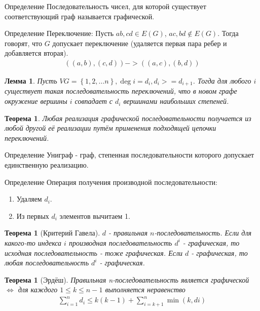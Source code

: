 \documentclass[a4paper,openany]{book}
\newcounter{TheoremCounter}
\newtheorem{theorem}[TheoremCounter]{Теорема}
\newtheorem*{lemma}{Лемма}
\newenvironment{definition}
{\begin{statement}{Определение}}
    {\end{statement}}
\newcommand{\set}[1]{
    \left\{ #1 \right\}
}
\begin{document}
\begin{definition}
  Последовательность чисел, для которой существует соответствующий граф
  называется графической.
\end{definition}

\begin{definition}
  Переключение: Пусть $ab,cd \in E(G)$, $ac,bd \notin E(G)$. Тогда
  говорят, что $G$ допускает переключение
  (удаляется первая пара ребер и добавляется вторая).
  \begin{align*}
    ((a, b), (c, d)) -> ((a, c), (b, d))
  \end{align*}
\end{definition}

\begin{lemma}
  Пусть $VG = \set{1, 2, … n}, \deg i = d_i, d_i >= d_{i + 1}$. Тогда для
  любого $i$ существует такая последовательность переключений, что в новом графе
  окружение вершины $i$ совпадает с $d_i$ вершинами наибольших степеней.
\end{lemma}

\begin{theorem}
  Любая реализация графической последовательности получается из любой другой её
  реализации путём применения подходящей цепочки переключений.
\end{theorem}

\begin{definition}
  Униграф - граф, степенная последовательности которого допускает
  единственную реализацию.
\end{definition}

\begin{definition}
  Операция получения производной последовательности:
  \begin{enumerate}
    \item Удаляем $d_i$.
    \item Из первых $d_i$ элементов вычитаем 1.
  \end{enumerate}
\end{definition}

\begin{theorem}[Критерий Гавела]
  $d$ - правильная $n$-последовательность. Если для какого-то индекса $i$
  производная последовательность $d^i$ - графическая, то исходная
  последовательность - тоже графическая. Если $d$ - графическая, то любая
  последовательность $d^i$ - графическая.
\end{theorem}

\begin{theorem}[Эрдёш]
  Правильная n-последовательность является графической $\Leftrightarrow$ для
  каждого $1 \leqslant k \leqslant n-1$ выполняется неравенство
  \begin{align*}
    \sum_{i = 1}^n d_i \leqslant k(k - 1) +  \sum_{i = k + 1}^n \min(k, di)
  \end{align*}
\end{theorem}
\end{document}
